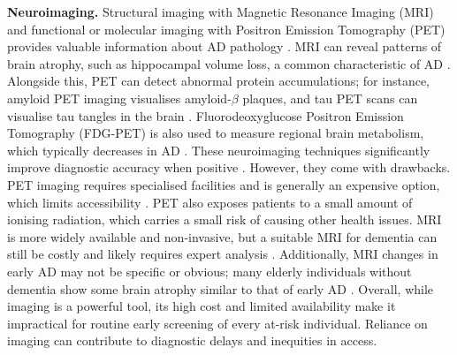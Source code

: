 \documentclass[a4paper,12pt]{article}
\begin{document}
\textbf{Neuroimaging.} Structural imaging with Magnetic Resonance Imaging (MRI) and functional or molecular imaging with Positron Emission Tomography (PET) provides valuable information about AD pathology \cite{jack2018nia, gelosa2012prognostic}. MRI can reveal patterns of brain atrophy, such as hippocampal volume loss, a common characteristic of AD \cite{jack2018nia}. Alongside this, PET can detect abnormal protein accumulations; for instance, amyloid PET imaging visualises amyloid-$\beta$ plaques, and tau PET scans can visualise tau tangles in the brain \cite{gelosa2012prognostic}. Fluorodeoxyglucose Positron Emission Tomography (FDG-PET) is also used to measure regional brain metabolism, which typically decreases in AD \cite{huseby2022blood}. These neuroimaging techniques significantly improve diagnostic accuracy when positive \cite{jack2018nia, huseby2022blood}. However, they come with drawbacks. PET imaging requires specialised facilities and is generally an expensive option, which limits accessibility \cite{gelosa2012prognostic}. PET also exposes patients to a small amount of ionising radiation, which carries a small risk of causing other health issues. MRI is more widely available and non-invasive, but a suitable MRI for dementia can still be costly and likely requires expert analysis \cite{jack2018nia}. Additionally, MRI changes in early AD may not be specific or obvious; many elderly individuals without dementia show some brain atrophy similar to that of early AD \cite{jack2018nia}. Overall, while imaging is a powerful tool, its high cost and limited availability make it impractical for routine early screening of every at-risk individual. Reliance on imaging can contribute to diagnostic delays and inequities in access.
\end{document}
